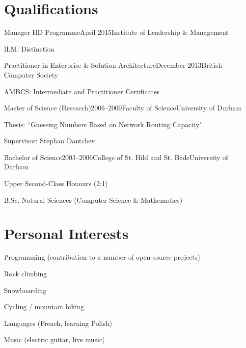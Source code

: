 \documentclass{cv}
\begin{document}

\section{Qualifications}

\begin{experience}{Manager HD Programme}{April 2015}{Institute of Leadership \& Management}{}
\item ILM: Distinction
\end{experience}

\begin{experience}{Practitioner in Enterprise \& Solution Architecture}{December 2013}{British Computer Society}{}
\item AMBCS: Intermediate and Practitioner Certificates
\end{experience}

\begin{experience}{Master of Science (Research)}{2006--2009}{Faculty of Science}{University of Durham}
\item Thesis: ``Guessing Numbers Based on Network Routing Capacity"
\item Supervisor: Stephan Dantchev
\end{experience}

\begin{experience}{Bachelor of Science}{2003--2006}{College of St. Hild and St. Bede}{University of Durham}
\item Upper Second-Class Honours (2:1)
\item B.Sc. Natural Sciences (Computer Science \& Mathematics)
\end{experience}


\section{Personal Interests}

\begin{experience}{}{}{}{}
\item Programming (contribution to a number of open-source projects)
\item Rock climbing
\item Snowboarding
\item Cycling / mountain biking
\item Languages (French, learning Polish)
\item Music (electric guitar, live music)
\end{experience}
\end{document}
